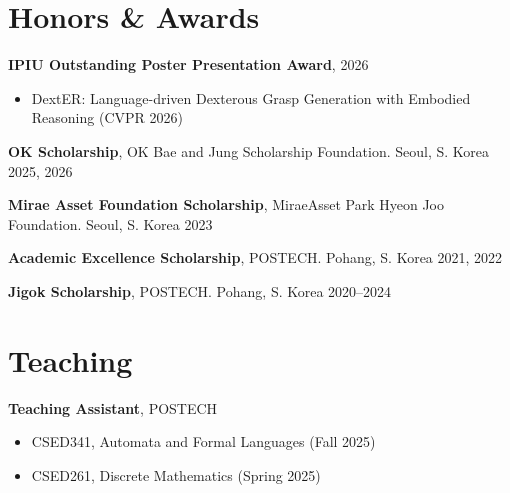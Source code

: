 \documentclass[11pt, letterpaper]{article}
\begin{document}
\section{Honors \& Awards}

\textbf{IPIU Outstanding Poster Presentation Award}, \hfill 2026
\begin{itemize}[leftmargin=1.5em, topsep=2pt, itemsep=0pt]
  \item DextER: Language-driven Dexterous Grasp Generation with Embodied Reasoning (CVPR 2026)
\end{itemize}

\vspace{4pt}
\textbf{OK Scholarship}, OK Bae and Jung Scholarship Foundation. Seoul, S. Korea \hfill 2025, 2026

\vspace{4pt}
\textbf{Mirae Asset Foundation Scholarship}, MiraeAsset Park Hyeon Joo Foundation. Seoul, S. Korea \hfill 2023

\vspace{4pt}
\textbf{Academic Excellence Scholarship}, POSTECH. Pohang, S. Korea \hfill 2021, 2022

\vspace{4pt}
\textbf{Jigok Scholarship}, POSTECH. Pohang, S. Korea \hfill 2020--2024

\section{Teaching}

\textbf{Teaching Assistant}, POSTECH
\begin{itemize}[leftmargin=1.5em, topsep=3pt, itemsep=1pt]
  \item CSED341, Automata and Formal Languages (Fall 2025)
  \item CSED261, Discrete Mathematics (Spring 2025)
\end{itemize}
\end{document}

